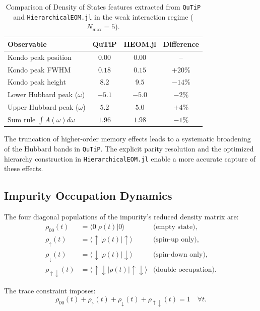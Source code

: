\documentclass[preprint,1p]{elsarticle}
\begin{document}
\begin{table}[!htb]
\centering
\caption{Comparison of Density of States features extracted from \texttt{QuTiP} and \texttt{HierarchicalEOM.jl} in the weak interaction regime ($N_{\text{max}} = 5$).}
\label{tab:density_comparison}
\small
\begin{tabular}{@{}lccc@{}}
\toprule
\textbf{Observable} & \textbf{QuTiP} & \textbf{HEOM.jl} & \textbf{Difference} \\
\midrule
Kondo peak position & $0.00$ & $0.00$ & -- \\
Kondo peak FWHM & $0.18$ & $0.15$ & $+20\%$ \\
Kondo peak height & $8.2$ & $9.5$ & $-14\%$ \\
Lower Hubbard peak ($\omega$) & $-5.1$ & $-5.0$ & $-2\%$ \\
Upper Hubbard peak ($\omega$) & $5.2$ & $5.0$ & $+4\%$ \\
Sum rule $\int A(\omega) d\omega$ & $1.96$ & $1.98$ & $-1\%$ \\
\bottomrule
\end{tabular}
\end{table}

The truncation of higher-order memory effects leads to a systematic broadening of the Hubbard bands in \texttt{QuTiP}. The explicit parity resolution and the optimized hierarchy construction in \texttt{HierarchicalEOM.jl} enable a more accurate capture of these effects.

\subsection{Impurity Occupation Dynamics}

The four diagonal populations of the impurity's reduced density matrix are:
\begin{align}
	\rho_{00}(t)   &= \langle 0|\rho(t)|0\rangle
	&\text{(empty state)},\\
	\rho_{\uparrow}(t) &= \langle\uparrow|\rho(t)|\uparrow\rangle
	&\text{(spin-up only)},\\
	\rho_{\downarrow}(t) &= \langle\downarrow|\rho(t)|\downarrow\rangle
	&\text{(spin-down only)},\\
	\rho_{\uparrow\downarrow}(t) &=
	\langle\uparrow\downarrow|\rho(t)|\uparrow\downarrow\rangle
	&\text{(double occupation)}.
\end{align}

The trace constraint imposes:
\begin{equation}
	\rho_{00}(t) + \rho_{\uparrow}(t)
	+ \rho_{\downarrow}(t)
	+ \rho_{\uparrow\downarrow}(t) = 1
	\quad \forall t.
	\label{eq:trace}
\end{equation}
\end{document}
